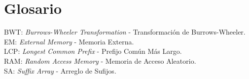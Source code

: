 \chapter*{Glosario}

BWT: \textit{Burrows-Wheeler Transformation} -  Transformación de Burrows-Wheeler.\\
EM: \textit{External Memory} - Memoria Externa.\\
LCP: \textit{Longest Common Prefix} - Prefijo Común Más Largo.\\
RAM: \textit{Random Access Memory} - Memoria de Acceso Aleatorio.\\
SA: \textit{Suffix Array} - Arreglo de Sufijos.


